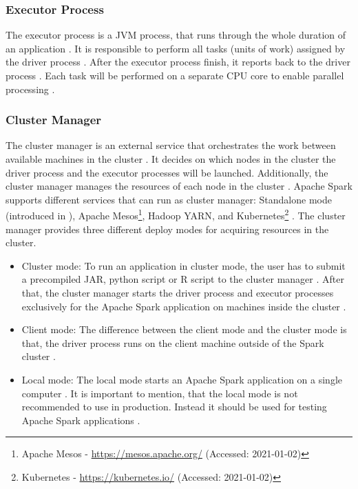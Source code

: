 \subsubsection{Executor Process}
The executor process is a JVM process, that runs through the whole duration of an application \cite{Hien2018Spark, Apache2020Spark}.
It is responsible to perform all tasks (units of work) assigned by the driver process \cite{Chambers2018Spark}.
After the executor process finish, it reports back to the driver process \cite{Chambers2018Spark}.
Each task will be performed on a separate CPU core to enable parallel processing \cite{Hien2018Spark}.


\subsubsection{Cluster Manager}
\label{subsubsec:04_spark_architecture_manager}
The cluster manager is an external service that orchestrates the work between available machines in the cluster \cite{Hien2018Spark, Apache2020Spark}.
It decides on which nodes in the cluster the driver process and the executor processes will be launched.
Additionally, the cluster manager manages the resources of each node in the cluster \cite{Hien2018Spark, Chambers2018Spark}.
Apache Spark supports different services that can run as cluster manager: Standalone mode (introduced in ), Apache Mesos\footnote{Apache Mesos - \url{https://mesos.apache.org/} (Accessed: 2021-01-02)}, Hadoop YARN\cite{Murthy2013Yarn}, and Kubernetes\footnote{Kubernetes - \url{https://kubernetes.io/} (Accessed: 2021-01-02)} \cite{Apache2020Spark}.
The cluster manager provides three different deploy modes for acquiring resources in the cluster.
\begin{itemize}
\item Cluster mode:
To run an application in cluster mode, the user has to submit a precompiled JAR, python script or R script to the cluster manager \cite{Chambers2018Spark}. After that, the cluster manager starts the driver process and executor processes exclusively for the Apache Spark application on machines inside the cluster \cite{Chambers2018Spark, Hien2018Spark}.

\item Client mode:
The difference between the client mode and the cluster mode is that, the driver process runs on the client machine outside of the Spark cluster \cite{Chambers2018Spark}.

\item Local mode:
The local mode starts an Apache Spark application on a single computer \cite{Chambers2018Spark}. It is important to mention, that the local mode is not recommended to use in production. Instead it should be used for testing Apache Spark applications \cite{Chambers2018Spark}.
\end{itemize}


